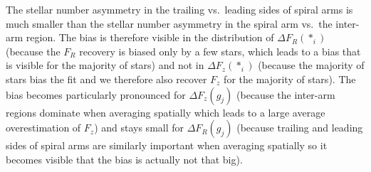 \documentclass[iop,revtex4,numberedappendix,appendixfloats]{emulateapj}
\begin{document}
The stellar number asymmetry in the trailing vs.\ leading sides of spiral arms is much smaller than the stellar number asymmetry in the spiral arm vs.\ the inter-arm region. The bias is therefore visible in the distribution of $\Delta F_R(*_i)$ (because the $F_R$ recovery is biased only by a few stars, which leads to a bias that is visible for the majority of stars) and not in $\Delta F_z(*_i)$ (because the majority of stars bias the fit and we therefore also recover $F_z$ for the majority of stars). The bias becomes particularly pronounced for $\Delta F_z(g_j)$ (because the inter-arm regions dominate when averaging spatially which leads to a large average overestimation of $F_z$) and stays small for $\Delta F_R(g_j)$ (because trailing and leading sides of spiral arms are similarly important when averaging spatially so it becomes visible that the bias is actually not that big).
\end{document}
